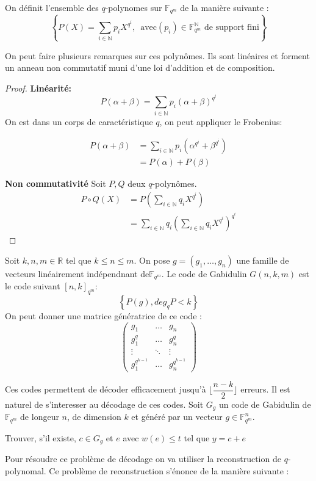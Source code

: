 \documentclass[12pt]{article}
\begin{document}
\begin{defi}
On définit l'ensemble des $q$-polynomes sur $\mathbb{F}_{q^m}$ de la manière suivante :
$$ \left\{ P(X)=\sum_{i \in \mathbb{N}} p_iX^{q^i} ,\, \text{ avec} (p_i) \in \mathbb{F}_{q^m}^{\mathbb{N}} \text{ de support fini}   \right\}$$
\end{defi}
On peut faire plusieurs remarques sur ces polynômes. Ils sont linéaires et forment un anneau non commutatif muni d'une loi d'addition et de composition.

\begin{proof}
\textbf{Linéarité:}
$$P(\alpha + \beta) = \sum_{i \in \mathbb{N}} p_i(\alpha +\beta)^{q^i}$$
On est dans un corps de caractéristique $q$, on peut appliquer le Frobenius:

\begin{align*}
P(\alpha + \beta) &= \sum_{i \in \mathbb{N}} p_i(\alpha^{q^i} +\beta^{q^i}) \\
 &= P(\alpha) + P(\beta)
\end{align*}

\textbf{Non commutativité}
Soit $P,Q$ deux $q$-polynômes. 
\begin{align*}
 P \circ Q (X) &= P(\sum_{i \in \mathbb{N}} q_iX^{q^i}) \\
  &= \sum_{i \in \mathbb{N}} q_i(\sum_{i \in \mathbb{N}} q_iX^{q^i})^{q^i}
\end{align*}

\end{proof}
\begin{defi}
Soit $k,n,m \in \mathbb{R}$ tel que $k \leq n \leq m$. On pose $g=(g_1, \ldots, g_n)$ une famille de vecteurs linéairement indépendnant de$\mathbb{F}_{q^m}$. Le code de Gabidulin $G(n,k,m)$ est le code suivant $[n,k]_{q^m}$:
$$\left\{ P(g), deg_qP < k\right\}$$
\newline
On peut donner une matrice génératrice de ce code :
\newline
$$
\begin{pmatrix} 
g_1 & \ldots & g_n \\
g_1^q & \ldots & g_n^q \\
\vdots & \ddots & \vdots \\
g_1^{q^{k-1}} & \ldots & g_n^{q^{k-1}}
\end{pmatrix}
$$
\end{defi}
Ces codes permettent de décoder efficacement jusqu'à $\lfloor\dfrac{n-k}{2}\rfloor$ erreurs. Il est naturel de s'interesser au décodage de ces codes.
Soit $G_g$ un code de Gabidulin de $\mathbb{F}_{q^m}$ de longeur $n$, de dimension $k$ et généré par un vecteur $g \in \mathbb{F}_{q^m}^n$. 
\begin{defi}[Decoding$(y,G_g,t)$]
Trouver, s'il existe, $c \in G_g$ et $e$ avec $w(e) \leq t$ tel que $y = c + e$
\end{defi}
Pour résoudre ce problème de décodage on va utiliser la reconstruction de $q$-polynomal. Ce problème de reconstruction s'énonce de la manière suivante :
\end{document}
